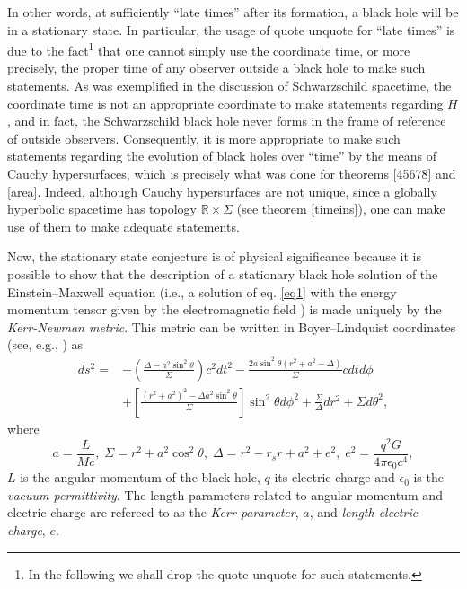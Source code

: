\documentclass[
12pt,		%
openright,	%
twoside,  %
a4paper,			%
chapter=TITLE,		%
english,			%
french,				%
spanish,			%
brazil				%
]{USPSC-classe/USPSC}
\begin{document}
In other words, at sufficiently ``late times'' after its formation, a black hole will be in a stationary state. In particular, the usage of quote unquote for ``late times'' is due to the fact\footnote{In the following we shall drop the quote unquote for such statements.} that one cannot simply use the coordinate time, or more precisely, the proper time of any observer outside a black hole to make such statements. As was exemplified in the discussion of Schwarzschild spacetime, the coordinate time is not an appropriate coordinate to make statements regarding $H$, and in fact, the Schwarzschild black hole never forms in the frame of reference of outside observers. Consequently, it is more appropriate to make such statements regarding the evolution of black holes over ``time'' by the means of Cauchy hypersurfaces, which is precisely what was done for theorems \ref{45678} and \ref{area}. Indeed, although Cauchy hypersurfaces are not unique, since a globally hyperbolic spacetime has topology $\mathbb{R}\times\Sigma$ (see theorem \ref{timeins}), one can make use of them to make adequate statements.

Now, the stationary state conjecture is of physical significance because it is possible to show that the description of a stationary black hole solution of the Einstein–Maxwell equation (i.e., a solution of eq. \ref{eq1} with the energy momentum tensor given by the electromagnetic field \cite{Wald2022}) is made uniquely by the \textit{Kerr-Newman metric}. This metric can be written in Boyer–Lindquist coordinates (see, e.g., \cite{Giulini2009}) as
\begin{equation}\label{kerrnewman}
    \begin{split}
   ds^2=&-\left(\frac{\Delta-a^2\sin^2\theta}{\Sigma}\right)c^2dt^2-\frac{2a\sin^2\theta(r^2+a^2-\Delta)}{\Sigma}cdtd\phi \\
&+\left[\frac{(r^2+a^2)^2-\Delta a^2\sin^2\theta}{\Sigma}\right]\sin^2\theta d\phi^2+\frac{\Sigma}{\Delta}dr^2+\Sigma d\theta^2,
\end{split}
\end{equation}
where
\begin{equation}
    a=\frac{L}{Mc},\; \Sigma=r^2+a^2\cos^2{\theta},\;\Delta=r^2-r_sr+a^2+e^2,\; e^2=\frac{q^2G}{4\pi\epsilon_0c^4},
\end{equation}
$L$ is the angular momentum of the black hole, $q$ its electric charge and $\epsilon_0$ is the \textit{vacuum permittivity}. The length parameters related to angular momentum and electric charge are refereed to as the \textit{Kerr parameter}, $a$, and \textit{length electric charge}, $e$. 
\end{document}
